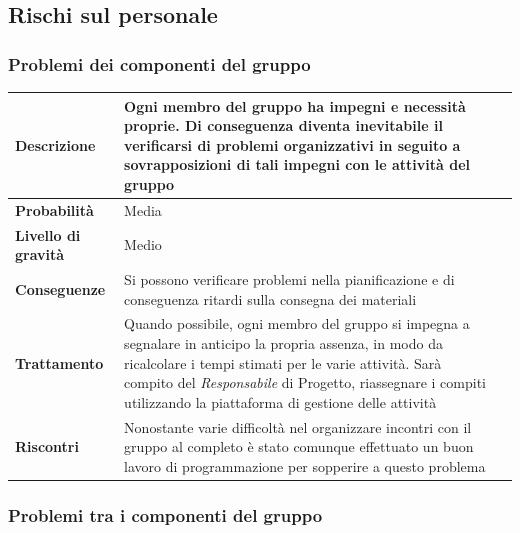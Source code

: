 \subsection{Rischi sul personale}
\subsubsection{Problemi dei componenti del gruppo}

\begin{center}
	
	\begin{tabular}{|>{\centering}m{4cm} ||>{\centering}m{8cm} |>{\centering\arraybackslash}m{0pt}@{}|}
		\hline
		\textbf{Descrizione} & Ogni membro del gruppo ha impegni e necessità proprie. Di conseguenza diventa inevitabile
		il verificarsi di problemi organizzativi in seguito a
		sovrapposizioni di tali impegni con le attività del gruppo & \\[2ex]
		\hline	
		\textbf{Probabilità} & Media &\\[1ex]
		\hline
		\textbf{Livello di gravità} & Medio & \\[1ex]
		\hline
		\textbf{Conseguenze} & Si possono verificare problemi nella pianificazione e di conseguenza ritardi sulla consegna dei materiali & \\[1ex]
		\hline
		\textbf{Trattamento} & Quando possibile, ogni membro del
		gruppo si impegna a segnalare in anticipo la propria assenza, in
		modo da ricalcolare i tempi stimati per le varie attività. Sarà
		compito del  \emph{Responsabile}  di Progetto, riassegnare i compiti
		utilizzando la piattaforma di gestione delle attività & \\[1ex] 
		\hline
		\textbf{Riscontri} & Nonostante varie difficoltà nel organizzare incontri con il gruppo al completo è stato comunque effettuato un buon lavoro di programmazione per sopperire a questo problema & \\[1ex]
		\hline
	\end{tabular}
	
\end{center}

\newpage
\subsubsection{Problemi tra i componenti del gruppo}

